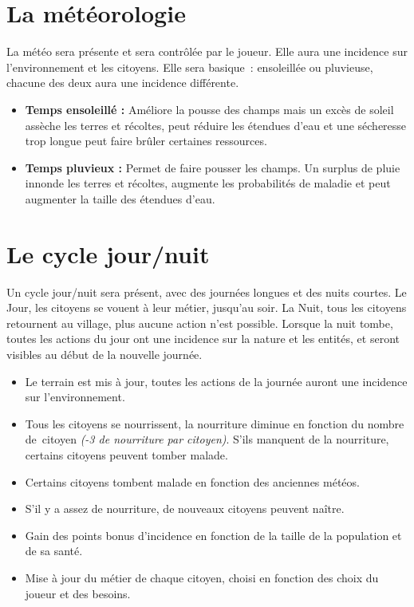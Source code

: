 \documentclass[a4paper]{article}
\newcommand{\alinea}{\hspace*{0.5cm}}
\begin{document}
    \section{La météorologie}
      \alinea La météo sera présente et sera contrôlée par le joueur. Elle aura une incidence sur l'environnement et les citoyens. Elle sera basique : ensoleillée ou pluvieuse, chacune des deux aura une incidence différente. 
      \begin{itemize} \small
        \item \textbf{Temps ensoleillé :} Améliore la pousse des champs mais un excès de soleil assèche les terres et récoltes, peut réduire les étendues d'eau et une sécheresse trop longue peut faire brûler certaines ressources.
        \item \textbf{Temps pluvieux :} Permet de faire pousser les champs. Un surplus de pluie innonde les terres et récoltes, augmente les probabilités de maladie et peut augmenter la taille des étendues d'eau.
      \end{itemize} \normalsize


    \section{Le cycle jour/nuit}
      \label{Cycle}
      \alinea Un cycle jour/nuit sera présent, avec des journées longues et des nuits courtes. Le Jour, les citoyens se vouent à leur métier, jusqu'au soir. La Nuit, tous les citoyens retournent au village, plus aucune action n'est possible. Lorsque la nuit tombe, toutes les actions du jour ont une incidence sur la nature et les entités, et seront visibles au début de la nouvelle journée.
      \begin{itemize} \small
        \item Le terrain est mis à jour, toutes les actions de la journée auront une incidence sur l'environnement.
        \item Tous les citoyens se nourrissent, la nourriture diminue en fonction du nombre de citoyen \textit{(-3 de nourriture par citoyen)}. S'ils manquent de la nourriture, certains citoyens peuvent tomber malade.
        \item Certains citoyens tombent malade en fonction des anciennes météos.
        \item S'il y a assez de nourriture, de nouveaux citoyens peuvent naître.
        \item Gain des points bonus d'incidence en fonction de la taille de la population et de sa santé.
        \item Mise à jour du métier de chaque citoyen, choisi en fonction des choix du joueur et des besoins.
      \end{itemize} \normalsize
\end{document}
